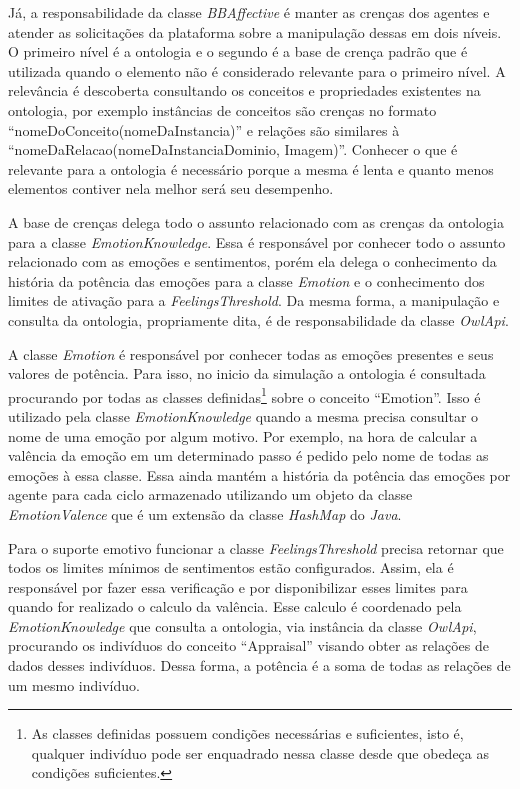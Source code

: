 Já, a responsabilidade da classe \emph{BBAffective} é manter as crenças dos
agentes e atender as solicitações da plataforma \jason sobre a manipulação
dessas em dois níveis. O primeiro nível é a ontologia e o segundo é a base de
crença padrão que é utilizada quando o elemento não é considerado relevante
para o primeiro nível. A relevância é descoberta consultando os conceitos e
propriedades existentes na ontologia, por exemplo instâncias de conceitos são
crenças no formato ``nomeDoConceito(nomeDaInstancia)'' e relações são
similares à ``nomeDaRelacao(nomeDaInstanciaDominio, Imagem)''. Conhecer o que
é relevante para a ontologia é necessário porque a mesma é lenta e quanto
menos elementos contiver nela melhor será seu desempenho.

A base de crenças delega todo o assunto relacionado com as crenças da
ontologia para a classe \emph{EmotionKnowledge}. Essa é responsável por
conhecer todo o assunto relacionado com as emoções e sentimentos, porém ela
delega o conhecimento da história da potência das emoções para a classe
\emph{Emotion} e o conhecimento dos limites de ativação para a
\emph{FeelingsThreshold}. Da mesma forma, a manipulação e consulta da
ontologia, propriamente dita, é de responsabilidade da classe \emph{OwlApi}.

A classe \emph{Emotion} é responsável por conhecer todas as emoções presentes
e seus valores de potência. Para isso, no inicio da simulação a ontologia é
consultada procurando por todas as classes definidas\footnote{As classes
definidas possuem condições necessárias e suficientes, isto é, qualquer
indivíduo pode ser enquadrado nessa classe desde que obedeça as condições
suficientes.} sobre o conceito ``Emotion''. Isso é utilizado pela classe
\emph{EmotionKnowledge} quando a mesma precisa consultar o nome de uma emoção
por algum motivo. Por exemplo, na hora de calcular a valência da emoção em um
determinado passo é pedido pelo nome de todas as emoções à essa classe. Essa
ainda mantém a história da potência das emoções por agente para cada ciclo
armazenado utilizando um objeto da classe \emph{EmotionValence} que é um
extensão da classe \emph{HashMap} do \emph{Java}.

Para o suporte emotivo funcionar a classe \emph{FeelingsThreshold} precisa
retornar que todos os limites mínimos de sentimentos estão configurados.
Assim, ela é responsável por fazer essa verificação e por disponibilizar esses
limites para quando for realizado o calculo da valência. Esse calculo é
coordenado pela \emph{EmotionKnowledge} que consulta a ontologia, via instância
da classe \emph{OwlApi}, procurando os indivíduos do conceito ``Appraisal''
visando obter as relações de dados desses indivíduos. Dessa forma, a potência
é a soma de todas as relações de um mesmo indivíduo.

